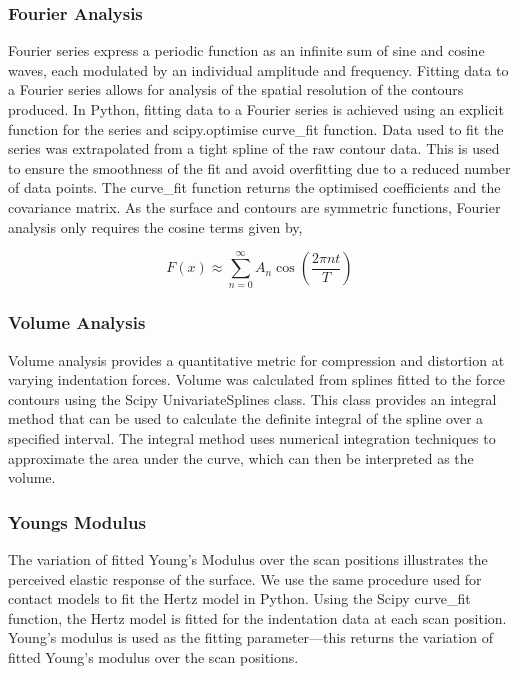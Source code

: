 \subsubsection{Fourier Analysis}

Fourier series express a periodic function as an infinite sum of sine and cosine waves, each modulated by an individual amplitude and frequency. Fitting data to a Fourier series allows for analysis of the spatial resolution of the contours produced. In Python, fitting data to a Fourier series is achieved using an explicit function for the series and scipy.optimise curve\_fit function. Data used to fit the series was extrapolated from a tight spline of the raw contour data. This is used to ensure the smoothness of the fit and avoid overfitting due to a reduced number of data points. The curve\_fit function returns the optimised coefficients and the covariance matrix. As the surface and contours are symmetric functions, Fourier analysis only requires the cosine terms given by, 

\begin{equation}
    F(x) \approx \sum^{\infty}_{n=0} A_{n} \cos\left( \frac{2\pi n t}{T}\right)
\end{equation}

\subsubsection{Volume Analysis}

Volume analysis provides a quantitative metric for compression and distortion at varying indentation forces. Volume was calculated from splines fitted to the force contours using the Scipy UnivariateSplines class. This class provides an integral method that can be used to calculate the definite integral of the spline over a specified interval. The integral method uses numerical integration techniques to approximate the area under the curve, which can then be interpreted as the volume.

\subsubsection{Youngs Modulus}

The variation of fitted Young's Modulus over the scan positions illustrates the perceived elastic response of the surface. We use the same procedure used for contact models to fit the Hertz model in Python. Using the Scipy curve\_fit function, the Hertz model is fitted for the indentation data at each scan position. Young's modulus is used as the fitting parameter—this returns the variation of fitted Young's modulus over the scan positions.